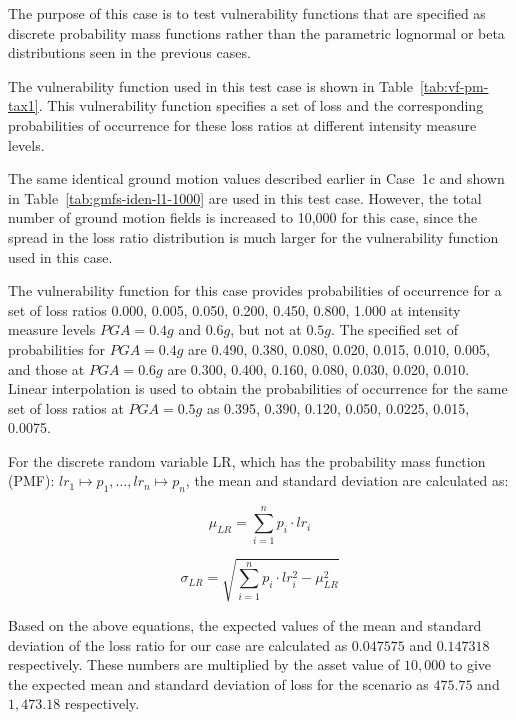 The purpose of this case is to test vulnerability functions that are specified as discrete probability mass functions rather than the parametric lognormal or beta distributions seen in the previous cases.



The vulnerability function used in this test case is shown in Table~\ref{tab:vf-pm-tax1}. This vulnerability function specifies a set of loss and the corresponding probabilities of occurrence for these loss ratios at different intensity measure levels.

The same identical ground motion values described earlier in Case~1c and shown in Table~\ref{tab:gmfs-iden-l1-1000} are used in this test case. However, the total number of ground motion fields is increased to 10,000 for this case, since the spread in the loss ratio distribution is much larger for the vulnerability function used in this case.

The vulnerability function for this case provides probabilities of occurrence for a set of loss ratios {0.000, 0.005, 0.050, 0.200, 0.450, 0.800, 1.000} at intensity measure levels $PGA = 0.4 g$ and $0.6 g$, but not at $0.5 g$. The specified set of probabilities for $PGA = 0.4 g$ are {0.490, 0.380, 0.080, 0.020, 0.015, 0.010, 0.005}, and those at $PGA = 0.6 g$ are {0.300, 0.400, 0.160, 0.080, 0.030, 0.020, 0.010}. Linear interpolation is used to obtain the probabilities of occurrence for the same set of loss ratios at $PGA = 0.5 g$ as {0.395, 0.390, 0.120, 0.050, 0.0225, 0.015, 0.0075}.

For the discrete random variable LR, which has the probability mass function (PMF): $lr_1 \mapsto p_1, \dotsc, lr_n \mapsto p_n$, the mean and standard deviation are calculated as:

\begin{equation}
\mu_{LR} = \sum_{i=1}^{n} p_i \cdot lr_i
\end{equation}

\begin{equation}
\sigma_{LR} = \sqrt{\sum_{i=1}^{n} p_i \cdot lr_i^2 - \mu_{LR}^2}
\end{equation}

Based on the above equations, the expected values of the mean and standard deviation of the loss ratio for our case are calculated as $0.047575$ and $0.147318$ respectively. These numbers are multiplied by the asset value of $10,000$ to give the expected mean and standard deviation of loss for the scenario as $475.75$ and $1,473.18$ respectively.